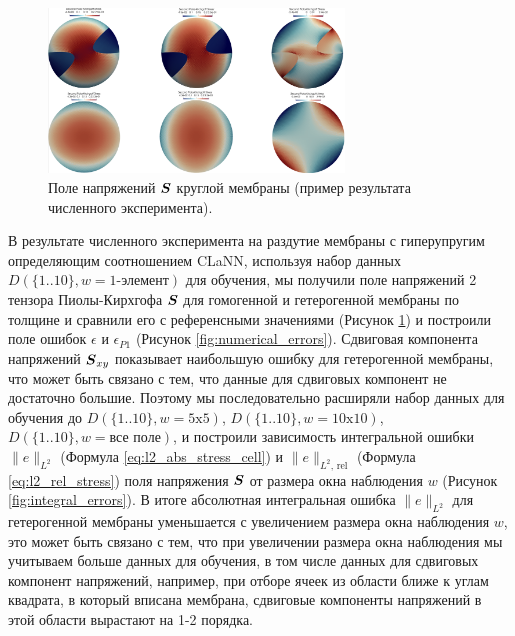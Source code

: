   \begin{figure}[H]
    \centering
    \includegraphics[width=0.7\textwidth]{img/Numerical/ref_stress.png}
    \caption{Поле напряжений $\boldsymbol{S}$ круглой мембраны (пример результата численного эксперимента).}
    \label{fig:numerical_experiment}
  \end{figure}
  
  В результате численного эксперимента на раздутие мембраны с гиперупругим определяющим соотношением CLaNN,
  используя набор данных $D (\{1..10\}, w=\text{1-элемент})$ для обучения, мы получили поле напряжений 2 тензора Пиолы-Кирхгофа 
  $\boldsymbol{S}$ для гомогенной и гетерогенной мембраны по толщине и сравнили его
  с референсными значениями (Рисунок \ref{fig:numerical_experiment}) и построили поле ошибок $\epsilon$ и $\epsilon_{P1}$ (Рисунок \ref{fig:numerical_errors}).
  Сдвиговая компонента напряжений $\boldsymbol{S}_{xy}$ показывает наибольшую ошибку для гетерогенной мембраны, 
  что может быть связано с тем, что данные для сдвиговых компонент не достаточно большие. Поэтому мы последовательно 
  расширяли набор данных для обучения до $D (\{1..10\}, w=\text{5x5})$, $D (\{1..10\}, w=\text{10x10})$, $D (\{1..10\}, w=\text{все поле})$, 
  и построили зависимость интегральной ошибки $\|e\|_{L^2}$ (Формула \ref{eq:l2_abs_stress_cell}) и $\|e\|_{L^2,\,\mathrm{rel}}$ (Формула \ref{eq:l2_rel_stress}) 
  поля напряжения $\boldsymbol{S}$ от размера окна наблюдения $w$ (Рисунок \ref{fig:integral_errors}). 
  В итоге абсолютная интегральная ошибка $\|e\|_{L^2}$  для гетерогенной мембраны уменьшается с увеличением размера окна наблюдения $w$, 
  это может быть связано с тем, что при увеличении размера окна наблюдения мы учитываем больше данных для обучения, в том числе данных 
  для сдвиговых компонент напряжений, например, при отборе ячеек из области ближе к углам квадрата, в который вписана мембрана, 
  сдвиговые компоненты напряжений в этой области вырастают на 1-2 порядка.
  
